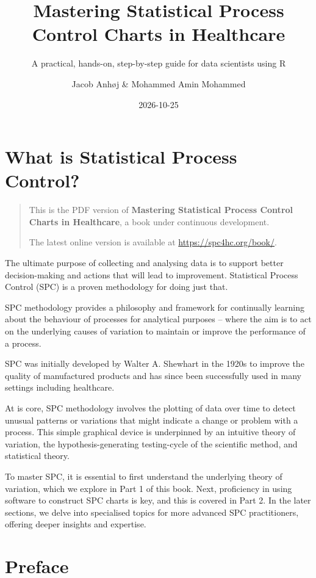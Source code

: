 \documentclass[
]{book}
\title{Mastering Statistical Process Control Charts in Healthcare}
\subtitle{A practical, hands-on, step-by-step guide for data scientists using R}
\author{Jacob Anhøj \& Mohammed Amin Mohammed}
\date{2026-10-25}
\begin{document}
\maketitle

{
\setcounter{tocdepth}{1}
\tableofcontents
}
\chapter*{What is Statistical Process Control?}\label{what}

\begin{quote}
This is the PDF version of \textbf{Mastering Statistical Process Control Charts in Healthcare}, a book under continuous development.

The latest online version is available at \url{https://spc4hc.org/book/}.
\end{quote}

The ultimate purpose of collecting and analysing data is to support better decision-making and actions that will lead to improvement. Statistical Process Control (SPC) is a proven methodology for doing just that.

SPC methodology provides a philosophy and framework for continually learning about the behaviour of processes for analytical purposes -- where the aim is to act on the underlying causes of variation to maintain or improve the performance of a process.

SPC was initially developed by Walter A. Shewhart in the 1920s to improve the quality of manufactured products and has since been successfully used in many settings including healthcare.

At is core, SPC methodology involves the plotting of data over time to detect unusual patterns or variations that might indicate a change or problem with a process. This simple graphical device is underpinned by an intuitive theory of variation, the hypothesis-generating testing-cycle of the scientific method, and statistical theory.

To master SPC, it is essential to first understand the underlying theory of variation, which we explore in Part 1 of this book. Next, proficiency in using software to construct SPC charts is key, and this is covered in Part 2. In the later sections, we delve into specialised topics for more advanced SPC practitioners, offering deeper insights and expertise.

\chapter*{Preface}\label{preface}
\end{document}
